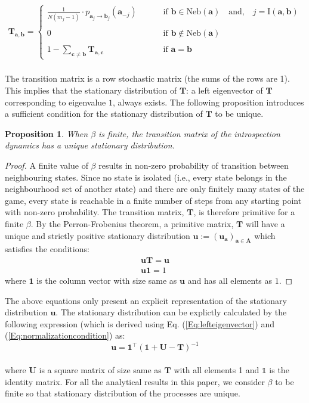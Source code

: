 \documentclass[11pt]{article}
\theoremstyle{plainCl1}
\newtheorem{Prop}{Proposition}
\theoremstyle{plainCl2}
\newcommand{\A}{\mathbf{A}}
\newcommand{\abf}{\mathbf{a}}
\newcommand{\bbf}{\mathbf{b}}
\newcommand{\cbf}{\mathbf{c}}
\newcommand{\T}{\mathbf{T}}
\newcommand{\ubf}{\mathbf{u}}
\begin{document}
\begin{align}
\T_{\abf, \bbf} = 
\begin{cases}
\frac{1}{N(m_j-1)}  \cdot p_{\abf_{j} \to \bbf_{j}} (\abf_{-j}) \quad  \quad &\text{ if }\bbf \in \mathrm{Neb}(\abf) \quad \text{and,} \quad j = \mathrm{I}(\abf,\bbf)\\ \\ 
0 \quad &\text{ if } \bbf \notin \mathrm{Neb}(\abf) \\ \\
1 - \sum_{\cbf \neq \bbf} \T_{\abf,\cbf} \quad &\text{ if } \abf = \bbf
\end{cases}
\label{Eq:transition-matrix}
\end{align} \\ 
\noindent The transition matrix is a row stochastic matrix (the sums of the rows are 1). This implies that the stationary distribution of $\T$: a left eigenvector of $\T$ corresponding to eigenvalue $1$, always exists. The following proposition introduces a sufficient condition for the stationary distribution of $\T$ to be unique. 
\begin{Prop} When $\beta$ is finite, the transition matrix of the introspection dynamics has a unique stationary distribution. 
\label{Prop:unique-stationary-dist}
\end{Prop}
\begin{proof}
A finite value of $\beta$ results in non-zero probability of transition between neighbouring states. Since no state is isolated (i.e., every state belongs in the neighbourhood set of another state) and there are only finitely many states of the game, every state is reachable in a finite number of steps from any starting point with non-zero probability. The transition matrix, $\T$, is therefore primitive for a finite $\beta$. By the Perron-Frobenius theorem, a primitive matrix, $\T$ will have a unique and strictly positive stationary distribution $\ubf := (\ubf_\abf)_{\abf \in \A}$ which satisfies the conditions: 
\begin{eqnarray}
\label{Eq:lefteigenvector}
\ubf \T = \ubf \\ 
\label{Eq:normalizationcondition}
\ubf \mathbf{1} = 1
\end{eqnarray}
\noindent where $\mathbf{1}$ is the column vector with size same as $\ubf$ and has all elements as $1$. 
\end{proof}
\noindent The above equations only present an explicit representation of the stationary distribution $\ubf$. The stationary distribution can be explictly calculated by the following expression (which is derived using Eq. (\ref{Eq:lefteigenvector}) and (\ref{Eq:normalizationcondition}) as:
\begin{equation}
\ubf = \mathbf{1}^\intercal (\mathbb{1} + \mathbf{U} - \T)^{-1}
\label{Eq:explicit-stationary-dist-representation}
\end{equation} \\
where $\mathbf{U}$ is a square matrix of size same as $\T$ with all elements 1 and $\mathbb{1}$ is the identity matrix. For all the analytical results in this paper, we consider $\beta$ to be finite so that stationary distribution of the processes are unique. \\
\end{document}
